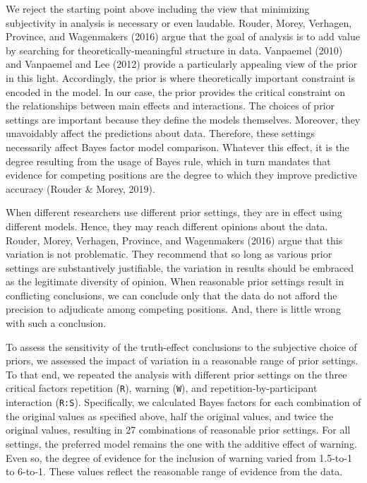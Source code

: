 \documentclass[
  english,
  ,man]{apa6}
\begin{document}
We reject the starting point above including the view that minimizing subjectivity in analysis is necessary or even laudable. Rouder, Morey, Verhagen, Province, and Wagenmakers (2016) argue that the goal of analysis is to add value by searching for theoretically-meaningful structure in data. Vanpaemel (2010) and Vanpaemel and Lee (2012) provide a particularly appealing view of the prior in this light. Accordingly, the prior is where theoretically important constraint is encoded in the model. In our case, the prior provides the critical constraint on the relationships between main effects and interactions. The choices of prior settings are important because they define the models themselves. Moreover, they unavoidably affect the predictions about data. Therefore, these settings necessarily affect Bayes factor model comparison. Whatever this effect, it is the degree resulting from the usage of Bayes rule, which in turn mandates that evidence for competing positions are the degree to which they improve predictive accuracy (Rouder \& Morey, 2019).

When different researchers use different prior settings, they are in effect using different models. Hence, they may reach different opinions about the data. Rouder, Morey, Verhagen, Province, and Wagenmakers (2016) argue that this variation is not problematic. They recommend that so long as various prior settings are substantively justifiable, the variation in results should be embraced as the legitimate diversity of opinion. When reasonable prior settings result in conflicting conclusions, we can conclude only that the data do not afford the precision to adjudicate among competing positions. And, there is little wrong with such a conclusion.

To assess the sensitivity of the truth-effect conclusions to the subjective choice of priors, we assessed the impact of variation in a reasonable range of prior settings. To that end, we repeated the analysis with different prior settings on the three critical factors repetition (\texttt{R}), warning (\texttt{W}), and repetition-by-participant interaction (\texttt{R:S}). Specifically, we calculated Bayes factors for each combination of the original values as specified above, half the original values, and twice the original values, resulting in 27 combinations of reasonable prior settings. For all settings, the preferred model remains the one with the additive effect of warning. Even so, the degree of evidence for the inclusion of warning varied from 1.5-to-1 to 6-to-1. These values reflect the reasonable range of evidence from the data.
\end{document}
